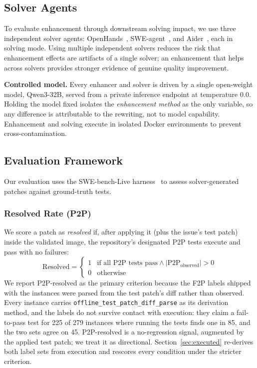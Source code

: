 \documentclass[journal]{IEEEtran}
\begin{document}
\subsection{Solver Agents}

To evaluate enhancement through downstream solving impact, we use three independent solver agents: OpenHands~\cite{wang2024openhands}, SWE-agent~\cite{yang2024swe}, and Aider~\cite{aider2024}, each in solving mode. Using multiple independent solvers reduces the risk that enhancement effects are artifacts of a single solver; an enhancement that helps across solvers provides stronger evidence of genuine quality improvement.

\textbf{Controlled model.} Every enhancer and solver is driven by a single open-weight model, Qwen3-32B, served from a private inference endpoint at temperature 0.0. Holding the model fixed isolates the \emph{enhancement method} as the only variable, so any difference is attributable to the rewriting, not to model capability. Enhancement and solving execute in isolated Docker environments to prevent cross-contamination.

\subsection{Evaluation Framework}
\label{subsec:evaluation}

Our evaluation uses the SWE-bench-Live harness~\cite{zhang2025swebenchlive, jimenez2024swebench} to assess solver-generated patches against ground-truth tests.

\subsubsection{Resolved Rate (P2P)}
We score a patch as \emph{resolved} if, after applying it (plus the issue's test patch) inside the validated image, the repository's designated P2P tests execute and pass with no failures:
\begin{equation}
\text{Resolved} = \begin{cases} 1 & \text{if all P2P tests pass} \wedge |\text{P2P}_{\text{observed}}| > 0 \\ 0 & \text{otherwise} \end{cases}
\end{equation}
We report P2P-resolved as the primary criterion because the F2P labels shipped with the instances were parsed from the test patch's diff rather than observed. Every instance carries \texttt{offline\_test\_patch\_diff\_parse} as its derivation method, and the labels do not survive contact with execution: they claim a fail-to-pass test for 225 of 279 instances where running the tests finds one in 85, and the two sets agree on 45. P2P-resolved is a no-regression signal, augmented by the applied test patch; we treat it as directional. Section~\ref{sec:executed} re-derives both label sets from execution and rescores every condition under the stricter criterion.
\end{document}
